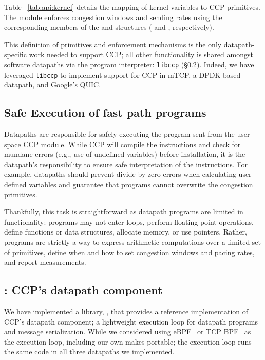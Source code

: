 Table ~\ref{tab:api:kernel} details the mapping of kernel variables
to CCP primitives.
%
The module enforces congestion windows and sending rates using the corresponding
members of the  and  structures ( and
, respectively).

This definition of primitives and enforcement mechanisms is the only datapath-specific
work needed to support CCP; all other functionality is shared amongst software datapaths
via the program interpreter: \texttt{libccp} (\S\ref{s:datapath:libccp}). Indeed, we have leveraged \texttt{libccp} to implement support for CCP in mTCP, a DPDK-based datapath, and Google's QUIC.

\subsection{Safe Execution of fast path programs}
\label{s:datapath:fold}
Datapaths are responsible for safely executing the program sent from the user-space CCP module. While CCP will compile the instructions and check for mundane errors (e.g., use of undefined variables) before installation, it is the datapath’s responsibility to ensure safe interpretation of the instructions. For example, datapaths should prevent divide by zero errors when calculating user defined variables and guarantee that programs cannot overwrite the congestion primitives.

Thankfully, this task is straightforward as datapath programs are limited in functionality: 
programs may not enter loops, perform floating point operations, define functions or data structures, allocate memory, or use pointers. Rather, programs are strictly a way to express arithmetic computations over a limited set of primitives, define when and how to set congestion windows and pacing rates, and report measurements.

\subsection{: CCP's datapath component}
\label{s:datapath:libccp}
We have implemented a library, , that provides a reference
implementation of CCP's datapath component; \ie a lightweight execution loop for
datapath programs and message serialization. 
While we considered using eBPF~\cite{ebpf} or TCP BPF~\cite{tcpbpf}
as the execution loop, including our own makes  portable; the execution loop runs the same code in all three datapaths we implemented.

